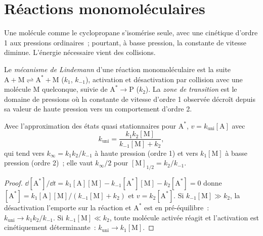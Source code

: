 \section{Réactions monomoléculaires}

Une molécule comme le cyclopropane s'isomérise seule, avec une cinétique
d'ordre 1 aux pressions ordinaires~; pourtant, à basse pression, la
constante de vitesse diminue. L'énergie nécessaire vient des
collisions.

\begin{definition}\label{def:b3:complex-kinetics:lindemann}
Le \emph{mécanisme de Lindemann} d'une réaction
monomoléculaire est la suite $\mathrm{A + M \rightleftharpoons A^* + M}$ ($k_1$, $k_{-1}$),
activation et désactivation par collision avec une molécule M
quelconque, suivie de $\mathrm{A^* \to P}$ ($k_2$). La
\emph{zone de transition} est le domaine de
pressions où la constante de vitesse d'ordre 1 observée décroît depuis
sa valeur de haute pression vers un comportement d'ordre 2.
\end{definition}

\begin{theorem}\label{thm:b3:complex-kinetics:lindemann}
Avec l'approximation des états quasi stationnaires pour $\mathrm{A^*}$, $v = k_{\mathrm{uni}}[\mathrm A]$ avec
\[
  k_{\mathrm{uni}} = \frac{k_1k_2[\mathrm M]}{k_{-1}[\mathrm M] + k_2},
\]
qui tend vers $k_\infty = k_1k_2/k_{-1}$ à haute pression (ordre 1) et
vers $k_1[\mathrm M]$ à basse pression (ordre 2)~; elle vaut
$k_\infty/2$ pour $[\mathrm M]_{1/2} = k_2/k_{-1}$.
\end{theorem}

\begin{proof}
$\dd[\mathrm{A^*}]/\dd t = k_1[\mathrm A][\mathrm M] - k_{-1}[\mathrm{A^*}][\mathrm M] - k_2[\mathrm{A^*}] = 0$ donne $[\mathrm{A^*}] =
k_1[\mathrm A][\mathrm M]/(k_{-1}[\mathrm M] + k_2)$ et $v = k_2[\mathrm{A^*}]$. Si $k_{-1}[\mathrm M] \gg k_2$,
la désactivation l'emporte sur la réaction et $\mathrm{A^*}$ est en
pré-équilibre~: $k_{\mathrm{uni}} \to k_1k_2/k_{-1}$. Si $k_{-1}[\mathrm M]
\ll k_2$, toute molécule activée réagit et l'activation est
cinétiquement déterminante~:
$k_{\mathrm{uni}} \to k_1[\mathrm M]$.
\end{proof}

